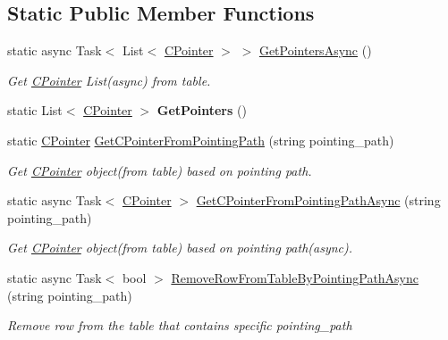 \subsection*{Static Public Member Functions}
\begin{DoxyCompactItemize}
\item 
static async Task$<$ List$<$ \mbox{\hyperlink{classOSML_1_1Cache_1_1CPointer}{C\+Pointer}} $>$ $>$ \mbox{\hyperlink{classOSML_1_1Cache_1_1Db_1_1CPDbManager_a6929050942d7f04fc1066d494549baa7}{Get\+Pointers\+Async}} ()
\begin{DoxyCompactList}\small\item\em Get \mbox{\hyperlink{classOSML_1_1Cache_1_1CPointer}{C\+Pointer}} List(async) from table. \end{DoxyCompactList}\item 
\mbox{\label{classOSML_1_1Cache_1_1Db_1_1CPDbManager_a749855f3f472e9e55d3902c7fc2ad182}} 
static List$<$ \mbox{\hyperlink{classOSML_1_1Cache_1_1CPointer}{C\+Pointer}} $>$ {\bfseries Get\+Pointers} ()
\item 
static \mbox{\hyperlink{classOSML_1_1Cache_1_1CPointer}{C\+Pointer}} \mbox{\hyperlink{classOSML_1_1Cache_1_1Db_1_1CPDbManager_a795e89a6f96f96feb2fab051817005d3}{Get\+C\+Pointer\+From\+Pointing\+Path}} (string pointing\+\_\+path)
\begin{DoxyCompactList}\small\item\em Get \mbox{\hyperlink{classOSML_1_1Cache_1_1CPointer}{C\+Pointer}} object(from table) based on pointing path. \end{DoxyCompactList}\item 
static async Task$<$ \mbox{\hyperlink{classOSML_1_1Cache_1_1CPointer}{C\+Pointer}} $>$ \mbox{\hyperlink{classOSML_1_1Cache_1_1Db_1_1CPDbManager_a60a143a4ce5799ac85101be5d1911c9a}{Get\+C\+Pointer\+From\+Pointing\+Path\+Async}} (string pointing\+\_\+path)
\begin{DoxyCompactList}\small\item\em Get \mbox{\hyperlink{classOSML_1_1Cache_1_1CPointer}{C\+Pointer}} object(from table) based on pointing path(async). \end{DoxyCompactList}\item 
static async Task$<$ bool $>$ \mbox{\hyperlink{classOSML_1_1Cache_1_1Db_1_1CPDbManager_a1b69a9baeb45ca4d745750a8b24c9587}{Remove\+Row\+From\+Table\+By\+Pointing\+Path\+Async}} (string pointing\+\_\+path)
\begin{DoxyCompactList}\small\item\em Remove row from the table that contains specific pointing\+\_\+path \end{DoxyCompactList}\end{DoxyCompactItemize}
